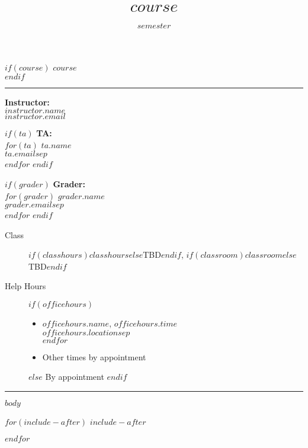 \documentclass[$if(fontsize)$$fontsize$,$endif$$if(lang)$$babel-lang$,$endif$$if(papersize)$$papersize$,$endif$$for(classoption)$$classoption$$sep$,$endfor$]{article}
\title{$course$}
\date{$semester$}
\providecommand{\tightlist}{%
  \setlength{\itemsep}{0pt}\setlength{\parskip}{0pt}}
\begin{document}
\thispagestyle{firststyle}
\begin{center}
$if(course)$
{\Large $course$}\\[.5cm]
$endif$
\end{center}
\hrule
\vspace{.5cm}

\begin{minipage}[t]{.45\textwidth}
{\bf Instructor:}\\
$instructor.name$\\
$instructor.email$

$if(ta)$
{\bf TA:}\\
$for(ta)$ $ta.name$\\$ta.email$$sep$\\[.5cm]$endfor$
$endif$

$if(grader)$
{\bf Grader:}\\
$for(grader)$ $grader.name$\\$grader.email$$sep$\\[.5cm]$endfor$
$endif$
\end{minipage}\hfill
\begin{minipage}[t]{.45\textwidth}
\begin{description}
\item[Class] $if(classhours)$$classhours$$else$TBD$endif$, $if(classroom)$$classroom$$else$TBD$endif$
\item[Help Hours]\phantom{i}
$if(officehours)$
\hspace*{1in}\begin{itemize}\tightlist
$for(officehours)$\item $officehours.name$, $officehours.time$\\$officehours.location$$sep$\\$endfor$
\item Other times by appointment
\end{itemize}
$else$
By appointment
$endif$
\end{description}
\end{minipage}
\vspace{.25cm}
\hrule

$body$



$for(include-after)$
$include-after$

$endfor$
\end{document}

